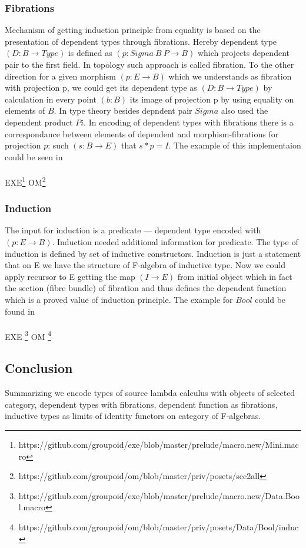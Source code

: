 \documentclass[11pt,oneside]{article}
\begin{document}
\subsubsection{Fibrations}

Mechanism of getting induction principle from equality is based on the presentation
of dependent types through fibrations. Hereby dependent type $(D: B \rightarrow Type)$ is defined as $(p: Sigma\ B\ P \rightarrow B)$
which projects dependent pair to the first field. In topology such approach is called fibration.
To the other direction for a given morphism $(p: E \rightarrow B)$ which we understands as fibration with projection p,
we could get its dependent type as $(D: B \rightarrow Type)$ by calculation in every point $(b: B)$ its image of
projection p by using equality on elements of $B$. In type theory besides depndent pair $Sigma$ also
used the dependent product $Pi$. In encoding of dependent types with fibrations there is a correspondance
between elements of dependent and morphism-fibrations for projection $p$: such $(s: B \rightarrow E)$ that $s * p = I$.
The example of this implementaion could be seen in\\
\\
EXE\footnote{https://github.com/groupoid/exe/blob/master/prelude/macro.new/Mini.macro}
OM\footnote{https://github.com/groupoid/om/blob/master/priv/posets/sec2all}

\subsubsection{Induction}
The input for induction is a predicate — dependent type encoded with $(p: E \rightarrow B)$.
Induction needed additional information for predicate. The type of induction is defined
by set of inductive constructors. Induction is just a statement that on E we have the
structure of F-algebra of inductive type. Now we could apply recursor to E
getting the map $(I \rightarrow E)$ from initial object which in fact the section (fibre bundle) of fibration
and thus defines the dependent function which is a proved value of induction principle.
The example for $Bool$ could be found in\\
\\
EXE \footnote{https://github.com/groupoid/exe/blob/master/prelude/macro.new/Data.Bool.macro}
OM \footnote{https://github.com/groupoid/om/blob/master/priv/posets/Data/Bool/induc}\\

\subsection{Conclusion}
Summarizing we encode types of source lambda calculus with objects of selected category,
dependent types with fibrations, dependent function as fibrations, inductive types as
limits of identity functors on category of F-algebras.

\end{document}
